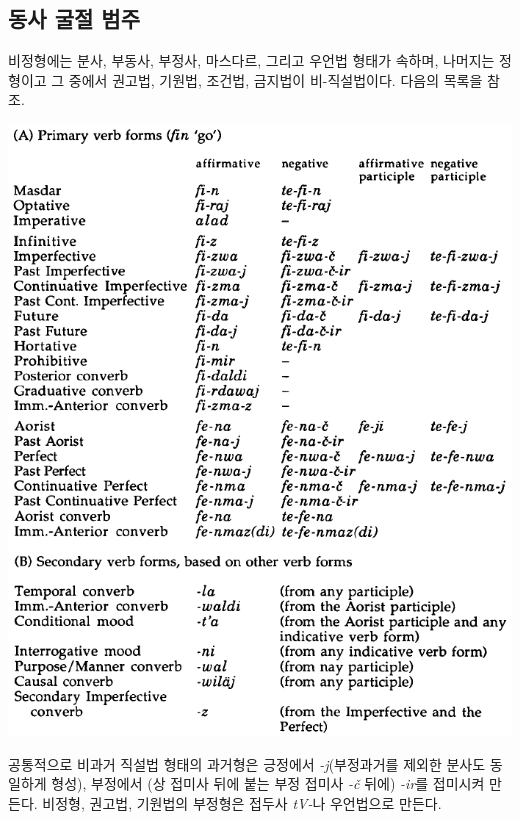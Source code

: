 \subsection{동사 굴절 범주}
비정형에는 분사, 부동사, 부정사, 마스다르, 그리고 우언법 형태가 속하며, 나머지는 정형이고 그 중에서 권고법, 기원법, 조건법, 금지법이 비-직설법이다. 다음의 목록을 참조.
\begin{center}
\includegraphics{Lezgian/src/veri.png}
\end{center}
공통적으로 비과거 직설법 형태의 과거형은 긍정에서 \textit{-j}(부정과거를 제외한 분사도 동일하게 형성), 부정에서 (상 접미사 뒤에 붙는 부정 접미사 \textit{-č} 뒤에) \textit{-ir}를 접미시켜 만든다. 비정형, 권고법, 기원법의 부정형은 접두사 \textit{tV-}나 우언법으로 만든다.
